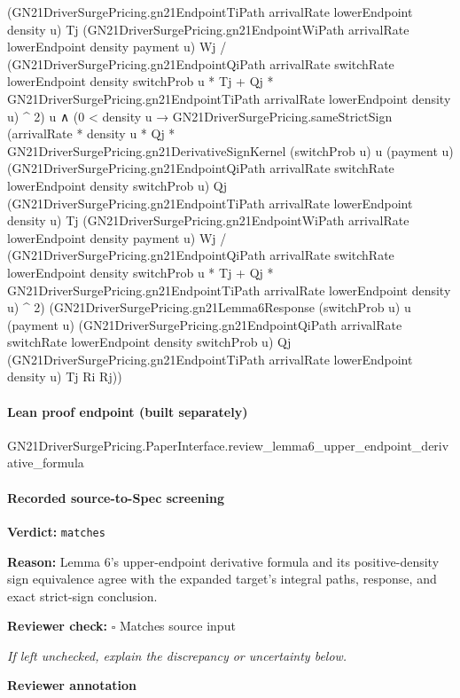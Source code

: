 \documentclass[10pt]{article}
\newcommand{\reviewerbox}{%
  \par\noindent\fbox{\parbox{0.96\linewidth}{\rule{0pt}{0.38in}}}\par
}
\newcommand{\reviewmatch}[1]{%
  \par\noindent\textbf{Reviewer check:} $\square$\; #1\par
  \noindent\emph{If left unchecked, explain the discrepancy or uncertainty below.}\par
}
\begin{document}
\begin{ReviewVerbatim}
          (GN21DriverSurgePricing.gn21EndpointTiPath arrivalRate lowerEndpoint density u) Tj
          (GN21DriverSurgePricing.gn21EndpointWiPath arrivalRate lowerEndpoint density payment u) Wj /
      (GN21DriverSurgePricing.gn21EndpointQiPath arrivalRate switchRate lowerEndpoint density switchProb u * Tj +
          Qj * GN21DriverSurgePricing.gn21EndpointTiPath arrivalRate lowerEndpoint density u) ^
        2)
    u ∧
  (0 < density u →
    GN21DriverSurgePricing.sameStrictSign
      (arrivalRate * density u * Qj *
          GN21DriverSurgePricing.gn21DerivativeSignKernel (switchProb u) u (payment u)
            (GN21DriverSurgePricing.gn21EndpointQiPath arrivalRate switchRate lowerEndpoint density switchProb u) Qj
            (GN21DriverSurgePricing.gn21EndpointTiPath arrivalRate lowerEndpoint density u) Tj
            (GN21DriverSurgePricing.gn21EndpointWiPath arrivalRate lowerEndpoint density payment u) Wj /
        (GN21DriverSurgePricing.gn21EndpointQiPath arrivalRate switchRate lowerEndpoint density switchProb u * Tj +
            Qj * GN21DriverSurgePricing.gn21EndpointTiPath arrivalRate lowerEndpoint density u) ^
          2)
      (GN21DriverSurgePricing.gn21Lemma6Response (switchProb u) u (payment u)
        (GN21DriverSurgePricing.gn21EndpointQiPath arrivalRate switchRate lowerEndpoint density switchProb u) Qj
        (GN21DriverSurgePricing.gn21EndpointTiPath arrivalRate lowerEndpoint density u) Tj Ri Rj))
\end{ReviewVerbatim}

\paragraph{Lean proof endpoint (built separately)}\begin{ReviewVerbatim}
GN21DriverSurgePricing.PaperInterface.review_lemma6_upper_endpoint_derivative_formula
\end{ReviewVerbatim}

\paragraph{Recorded source-to-Spec screening}
\textbf{Verdict:} \texttt{matches}
\\
{\raggedright
\textbf{Reason:} Lemma 6's upper-\allowbreak{}endpoint derivative formula and its positive-\allowbreak{}density sign equivalence agree with the expanded target's integral paths, response, and exact strict-\allowbreak{}sign conclusion.\allowbreak{}
\par}
\reviewmatch{Matches source input}
\noindent\textbf{Reviewer annotation}\par
\reviewerbox
\clearpage
\hypertarget{source-claim-414ba26e7a98cabd}{}
\end{document}
